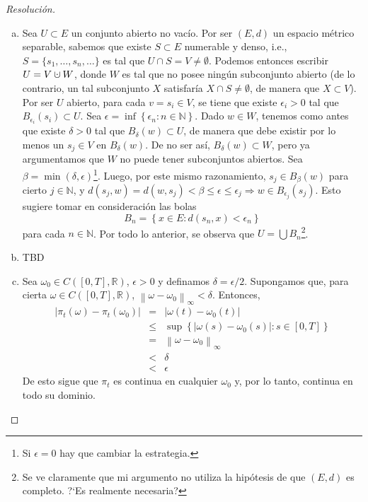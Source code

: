 \documentclass[a4paper,11pt]{article}
\newcommand{\norm}[1]{\left\lVert#1\right\rVert}
\newcommand{\normi}[1]{\norm{#1}_{\infty}}
\newcommand{\CT}{\ensuremath{C([0,T], \mathbb{R})}}
\newcommand{\cupdot}{\mathbin{\mathaccent\cdot\cup}}
\newcommand{\Bola}[2]{\ensuremath{B_{#2}(#1)}}
\begin{document}
\begin{proof}[Resoluci\'on]
$ $

\begin{enumerate}[a)]
    \item Sea $U \subset E$ un conjunto abierto no vacío. Por ser $(E,d)$ un
    espacio métrico separable, sabemos que existe
    $S \subset E$ numerable y denso, i.e., $S = \{s_1,\dots,s_n,\dots\}$
    es tal que $U \cap S = V \neq \emptyset$. Podemos entonces escribir
    $U = V \cupdot W$, donde $W$ es tal que no posee ningún subconjunto
    abierto (de lo contrario, un tal subconjunto $X$ satisfaría 
    $X \cap S \neq \emptyset$, de manera que $X \subset V$).
    Por ser $U$ abierto, para cada $v = s_i \in V$,
    se tiene que existe $\epsilon_i > 0$ tal que
    $\Bola{s_i}{\epsilon_i} \subset U$. Sea
    $\epsilon = \inf \left\{ \epsilon_n : n \in \mathbb{N} \right\}$.
    Dado $w \in W$, tenemos como antes que existe $\delta > 0$ tal que
    $\Bola{w}{\delta} \subset U$, de manera que debe existir por lo menos
    un $s_j \in V$ en $\Bola{w}{\delta}$. De no ser así,
    $\Bola{w}{\delta} \subset W$, pero ya argumentamos que $W$ no puede
    tener subconjuntos abiertos. Sea $\beta = \min(\delta, \epsilon)$\footnote
    {Si $\epsilon = 0$ hay que cambiar la estrategia.}.
    Luego, por este mismo razonamiento, $s_j \in \Bola{w}{\beta}$ para
    cierto $j \in \mathbb{N}$, y
    $d(s_j,w) = d(w,s_j) < \beta \leq \epsilon \leq \epsilon_j \Rightarrow 
    w \in \Bola{s_j}{\epsilon_j}$. Esto sugiere tomar en consideración las
    bolas
    $$B_n = \left\{ x \in E : d(s_n, x) < \epsilon_n \right\}$$
    para cada $n \in \mathbb{N}$. Por todo lo anterior, se observa que
    $U = \bigcup B_n$\footnote{Se ve claramente que mi argumento no utiliza
    la hipótesis de que $(E,d)$ es completo. ?`Es realmente necesaria?}.

    \item TBD

    \item Sea $\omega_0 \in \CT$, $\epsilon >0$ y definamos $\delta = \epsilon/2$.
    Supongamos que, para cierta $\omega \in \CT$,
    $\normi{\omega - \omega_0} < \delta$. Entonces,
    \begin{eqnarray*}
        |\pi_t(\omega) - \pi_t(\omega_0)| &=& |\omega(t) - \omega_0(t)| \\
        &\leq& \sup \left\{ |\omega(s) - \omega_0(s)| : s \in [0,T] \right\} \\
        &=& \normi{\omega - \omega_0} \\
        &<& \delta \\
        &<& \epsilon
    \end{eqnarray*}
    De esto sigue que $\pi_t$ es continua en cualquier $\omega_0$ y, por lo tanto,
    continua en todo su dominio.


\end{enumerate}
\end{proof}
\end{document}
